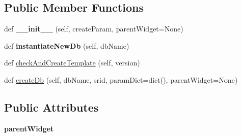 \subsection*{Public Member Functions}
\begin{DoxyCompactItemize}
\item 
\mbox{\label{class_dsg_tools_1_1_factories_1_1_db_creator_factory_1_1postgis_db_creator_1_1_postgis_db_creator_a8934164bdc2e511adb1e5c4c2dbf8a2e}} 
def {\bfseries \+\_\+\+\_\+init\+\_\+\+\_\+} (self, create\+Param, parent\+Widget=None)
\item 
\mbox{\label{class_dsg_tools_1_1_factories_1_1_db_creator_factory_1_1postgis_db_creator_1_1_postgis_db_creator_a3a5f06774467542e124e1b1a140af724}} 
def {\bfseries instantiate\+New\+Db} (self, db\+Name)
\item 
def \mbox{\hyperlink{class_dsg_tools_1_1_factories_1_1_db_creator_factory_1_1postgis_db_creator_1_1_postgis_db_creator_a2fbc730b348c20d45c1a31e77fd04ff6}{check\+And\+Create\+Template}} (self, version)
\item 
def \mbox{\hyperlink{class_dsg_tools_1_1_factories_1_1_db_creator_factory_1_1postgis_db_creator_1_1_postgis_db_creator_a651236665f823f015e669345182f60dc}{create\+Db}} (self, db\+Name, srid, param\+Dict=dict(), parent\+Widget=None)
\end{DoxyCompactItemize}
\subsection*{Public Attributes}
\begin{DoxyCompactItemize}
\item 
\mbox{\label{class_dsg_tools_1_1_factories_1_1_db_creator_factory_1_1postgis_db_creator_1_1_postgis_db_creator_a78a6ee86dd69054838a19f503a408c24}} 
{\bfseries parent\+Widget}
\end{DoxyCompactItemize}


